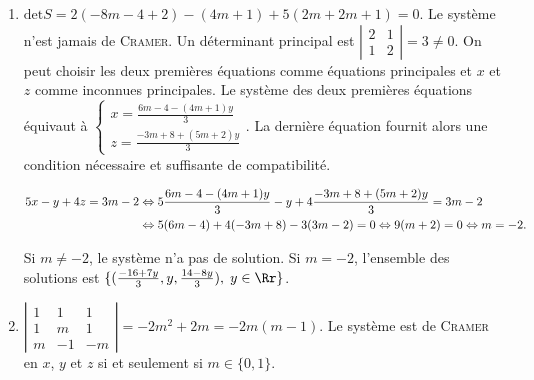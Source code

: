 {{\begin{enumerate}
La dernière équation fournit alors une condition nécessaire et suffisante de compatibilité (les termes en y disparaissent automatiquement pour $m\in\{1,6\}$ et donc pas la peine de les calculer).

\begin{align*}\ensuremath
7x+2y+(m-5)z=7&\Leftrightarrow7\frac{3+(m-6)y}{5}+3y+(m-5)\frac{14-(2m+3)y}{5}=7\Leftrightarrow 21+14(m-5)-35=0\\
 &\Leftrightarrow 14(m-6)= 0\Leftrightarrow m = 6.
\end{align*}

Si $m=1$, le système n'a pas de solution et si $m=6$, l'ensemble des solutions est $\{(\frac{3}{5},y,-\frac{y}{5}),\;y\in\Rr\}$.

\item  $\mbox{det}S=2(-8m-4+2)-(4m+1)+5(2m+2m+1)=0$. Le système n'est jamais de \textsc{Cramer}. Un déterminant principal est $\left|
\begin{array}{cc}
2&1\\
1&2
\end{array}
\right|=3\neq 0$. On peut choisir les deux premières équations comme équations principales et $x$ et $z$ comme inconnues principales. Le système des deux premières équations équivaut à $\left\{
\begin{array}{l}
x=\frac{6m-4-(4m+1)y}{3}\\
z=\frac{-3m+8+(5m+2)y}{3}
\end{array}
\right.$. La dernière équation fournit alors une condition nécessaire et suffisante de compatibilité.

\begin{align*}\ensuremath
5x-y+4z=3m-2&\Leftrightarrow5\frac{6m-4-(4m+1)y}{3}-y+4\frac{-3m+8+(5m+2)y}{3}=3m-2\\
 &\Leftrightarrow5(6m-4)+4(-3m+8)-3(3m-2)=0\Leftrightarrow9(m+2)=0\Leftrightarrow m=-2.
\end{align*}

Si $m\neq-2$, le système n'a pas de solution. Si $m=-2$, l'ensemble des solutions est $\{(\frac{-16+7y}{3},y,\frac{14-8y}{3}),\;y\in\Rr\}$.

\item  $\left|
\begin{array}{ccc}
1&1&1\\
1&m&1\\
m&-1&-m
\end{array}\right|=-2m^2+2m=-2m(m-1)$. Le système est de \textsc{Cramer} en $x$, $y$ et $z$ si et seulement si $m\in\{0,1\}$.


\end{enumerate}}}
